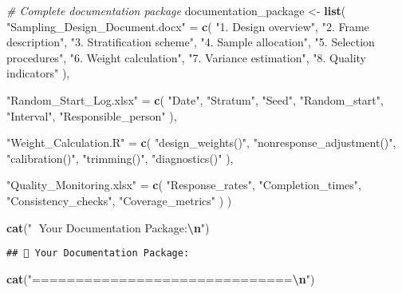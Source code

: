 \documentclass[
]{article}
\newenvironment{Shaded}{\begin{snugshade}}{\end{snugshade}}
\newcommand{\CommentTok}[1]{\textcolor[rgb]{0.56,0.35,0.01}{\textit{#1}}}
\newcommand{\FunctionTok}[1]{\textcolor[rgb]{0.13,0.29,0.53}{\textbf{#1}}}
\newcommand{\NormalTok}[1]{#1}
\newcommand{\OtherTok}[1]{\textcolor[rgb]{0.56,0.35,0.01}{#1}}
\newcommand{\SpecialCharTok}[1]{\textcolor[rgb]{0.81,0.36,0.00}{\textbf{#1}}}
\newcommand{\StringTok}[1]{\textcolor[rgb]{0.31,0.60,0.02}{#1}}
\begin{document}
\begin{Shaded}
\begin{Highlighting}[]
\CommentTok{\# Complete documentation package}
\NormalTok{documentation\_package }\OtherTok{\textless{}{-}} \FunctionTok{list}\NormalTok{(}
  \StringTok{"Sampling\_Design\_Document.docx"} \OtherTok{=} \FunctionTok{c}\NormalTok{(}
    \StringTok{"1. Design overview"}\NormalTok{,}
    \StringTok{"2. Frame description"}\NormalTok{,}
    \StringTok{"3. Stratification scheme"}\NormalTok{,}
    \StringTok{"4. Sample allocation"}\NormalTok{,}
    \StringTok{"5. Selection procedures"}\NormalTok{,}
    \StringTok{"6. Weight calculation"}\NormalTok{,}
    \StringTok{"7. Variance estimation"}\NormalTok{,}
    \StringTok{"8. Quality indicators"}
\NormalTok{  ),}
  
  \StringTok{"Random\_Start\_Log.xlsx"} \OtherTok{=} \FunctionTok{c}\NormalTok{(}
    \StringTok{"Date"}\NormalTok{, }\StringTok{"Stratum"}\NormalTok{, }\StringTok{"Seed"}\NormalTok{, }\StringTok{"Random\_start"}\NormalTok{, }
    \StringTok{"Interval"}\NormalTok{, }\StringTok{"Responsible\_person"}
\NormalTok{  ),}
  
  \StringTok{"Weight\_Calculation.R"} \OtherTok{=} \FunctionTok{c}\NormalTok{(}
    \StringTok{"design\_weights()"}\NormalTok{,}
    \StringTok{"nonresponse\_adjustment()"}\NormalTok{,}
    \StringTok{"calibration()"}\NormalTok{,}
    \StringTok{"trimming()"}\NormalTok{,}
    \StringTok{"diagnostics()"}
\NormalTok{  ),}
  
  \StringTok{"Quality\_Monitoring.xlsx"} \OtherTok{=} \FunctionTok{c}\NormalTok{(}
    \StringTok{"Response\_rates"}\NormalTok{, }\StringTok{"Completion\_times"}\NormalTok{,}
    \StringTok{"Consistency\_checks"}\NormalTok{, }\StringTok{"Coverage\_metrics"}
\NormalTok{  )}
\NormalTok{)}

\FunctionTok{cat}\NormalTok{(}\StringTok{"📁 Your Documentation Package:}\SpecialCharTok{\textbackslash{}n}\StringTok{"}\NormalTok{)}
\end{Highlighting}
\end{Shaded}

\begin{verbatim}
## 📁 Your Documentation Package:
\end{verbatim}

\begin{Shaded}
\begin{Highlighting}[]
\FunctionTok{cat}\NormalTok{(}\StringTok{"==============================}\SpecialCharTok{\textbackslash{}n}\StringTok{"}\NormalTok{)}
\end{Highlighting}
\end{Shaded}
\end{document}
